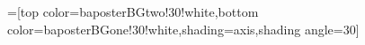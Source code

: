 \documentclass[portrait,final,a0paper]{baposter}
\begin{document}
\begin{poster}
  =[top color=baposterBGtwo!30!white,bottom color=baposterBGone!30!white,shading=axis,shading angle=30]

     \setlength{\leftimgwidth}{0.78em+8.0em}

    \newcommand{\colouredcircle}[1]{%
      \tikz{\useasboundingbox (-0.2em,-0.32em) rectangle(0.2em,0.32em); \draw[draw=black,fill=baposterBGone!80!black!#1!white,line width=0.03em] (0,0) circle(0.18em);}}


\end{poster}
\end{document}
